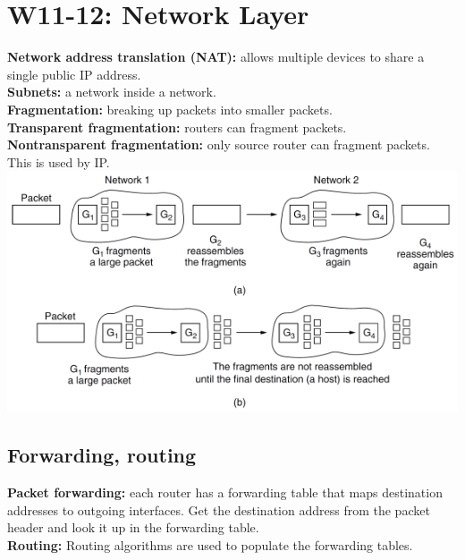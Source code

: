 \section{W11-12: Network Layer}
\textbf{Network address translation (NAT):} allows multiple devices to share a single public IP address.\\
\textbf{Subnets:} a network inside a network.\\
\textbf{Fragmentation:} breaking up packets into smaller packets.\\
\textbf{Transparent fragmentation:} routers can fragment packets.\\
\textbf{Nontransparent fragmentation:} only source router can fragment packets. This is used by IP.\\
\includegraphics[width=\linewidth]{figs/fragmentation.png}\\

\subsection{Forwarding, routing}
\textbf{Packet forwarding:} each router has a forwarding table that maps destination addresses to outgoing interfaces. Get the destination address from the packet header and look it up in the forwarding table.\\
\textbf{Routing:} Routing algorithms are used to populate the forwarding tables.\\

